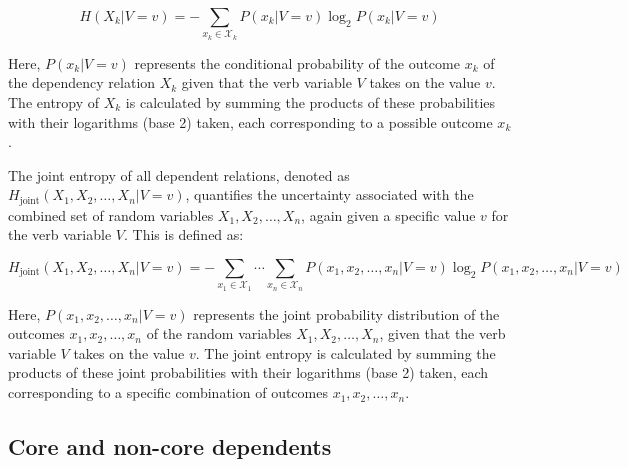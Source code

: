 $$
H(X_{k}|V=v)=
-\sum\limits_{x_{k}\in{}\mathcal{X}_{k}}{P(x_{k}|V=v)\log_{2}{P(x_{k}|V=v)}}
$$

Here, $P(x_k | V = v)$ represents the conditional probability of the outcome $x_k$ of the dependency relation $X_k$ given that the verb variable $V$ takes on the value $v$. The entropy of $X_k$ is calculated by summing the products of these probabilities with their logarithms (base 2) taken, each corresponding to a possible outcome $x_k$.

The joint entropy of all dependent relations, denoted as $H_{\text{joint}}(X_1, X_2, \ldots, X_n | V = v)$, quantifies the uncertainty associated with the combined set of random variables $X_1, X_2, \ldots, X_n$, again given a specific value $v$ for the verb variable $V$. This is defined as:

$$
H_{\text{joint}}(X_1, X_2, \ldots, X_n | V=v) =
-\sum\limits_{x_1\in{}\mathcal{X}_1}\cdots\sum\limits_{x_n\in{}\mathcal{X}_n}{P(x_1, x_2, \ldots,x_{n}|V=v)\log_2P(x_1, x_2, \ldots,x_n|V=v)}
$$

Here, $P(x_1, x_2, \ldots, x_n | V = v)$ represents the joint probability distribution of the outcomes $x_1, x_2, \ldots, x_n$ of the random variables $X_1, X_2, \ldots, X_n$, given that the verb variable $V$ takes on the value $v$. The joint entropy is calculated by summing the products of these joint probabilities with their logarithms (base 2) taken, each corresponding to a specific combination of outcomes $x_1, x_2, \ldots, x_n$.







\subsection{Core and non-core dependents}



